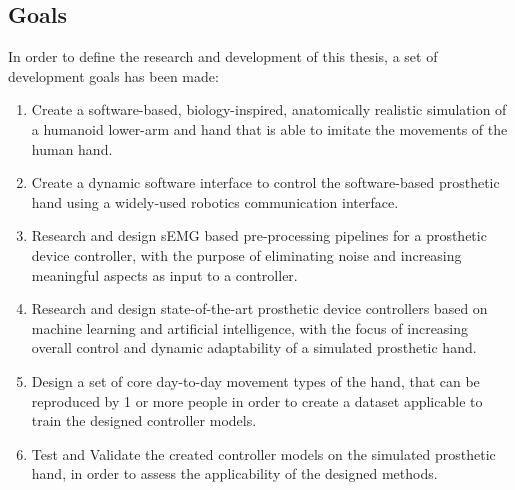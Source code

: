 \documentclass[../main.tex]{subfiles}
\begin{document}
\newpage
\subsection{Goals}
\label{sec:goals}

In order to define the research and development of this thesis, a set of development goals has been made:

\begin{enumerate}
\item Create a software-based, biology-inspired, anatomically realistic simulation of a humanoid lower-arm and hand that is able to imitate the movements of the human hand.
\item Create a dynamic software interface to control the software-based prosthetic hand using a widely-used robotics communication interface.
\item Research and design sEMG based pre-processing pipelines for a prosthetic device controller, with the purpose of eliminating noise and increasing meaningful aspects as input to a controller. 
\item Research and design state-of-the-art prosthetic device controllers based on machine learning and artificial intelligence, with the focus of increasing overall control and dynamic adaptability of a simulated prosthetic hand.
\item Design a set of core day-to-day movement types of the hand, that can be reproduced by 1 or more people in order to create a dataset applicable to train the designed controller models.
\item Test and Validate the created controller models on the simulated prosthetic hand, in order to assess the applicability of the designed methods.
\end{enumerate}
\end{document}
